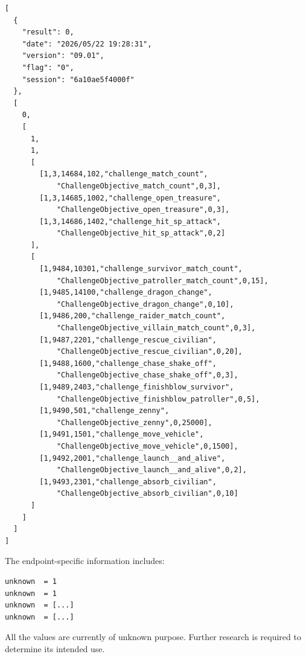 \begin{lstlisting}
[
  {
    "result": 0,
    "date": "2026/05/22 19:28:31",
    "version": "09.01",
    "flag": "0",
    "session": "6a10ae5f4000f"
  },
  [
    0,
    [
      1,
      1,
      [
        [1,3,14684,102,"challenge_match_count",
            "ChallengeObjective_match_count",0,3],
        [1,3,14685,1002,"challenge_open_treasure",
            "ChallengeObjective_open_treasure",0,3],
        [1,3,14686,1402,"challenge_hit_sp_attack",
            "ChallengeObjective_hit_sp_attack",0,2]
      ],
      [
        [1,9484,10301,"challenge_survivor_match_count",
            "ChallengeObjective_patroller_match_count",0,15],
        [1,9485,14100,"challenge_dragon_change",
            "ChallengeObjective_dragon_change",0,10],
        [1,9486,200,"challenge_raider_match_count",
            "ChallengeObjective_villain_match_count",0,3],
        [1,9487,2201,"challenge_rescue_civilian",
            "ChallengeObjective_rescue_civilian",0,20],
        [1,9488,1600,"challenge_chase_shake_off",
            "ChallengeObjective_chase_shake_off",0,3],
        [1,9489,2403,"challenge_finishblow_survivor",
            "ChallengeObjective_finishblow_patroller",0,5],
        [1,9490,501,"challenge_zenny",
            "ChallengeObjective_zenny",0,25000],
        [1,9491,1501,"challenge_move_vehicle",
            "ChallengeObjective_move_vehicle",0,1500],
        [1,9492,2001,"challenge_launch__and_alive",
            "ChallengeObjective_launch__and_alive",0,2],
        [1,9493,2301,"challenge_absorb_civilian",
            "ChallengeObjective_absorb_civilian",0,10]
      ]
    ]
  ]
]
\end{lstlisting}

The endpoint-specific information includes:

\begin{lstlisting}
unknown  = 1
unknown  = 1
unknown  = [...]
unknown  = [...]
\end{lstlisting}

\begin{tcolorbox}[colback=yellow!10,colframe=orange!80!black,title=Warning]
All the values are currently of unknown purpose.
Further research is required to determine its intended use.
\end{tcolorbox}

\newpage